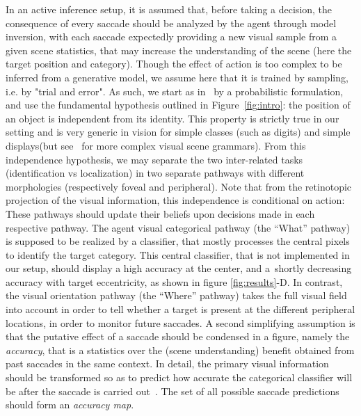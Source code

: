 \CNS
In an active inference setup, it is assumed that, before taking a decision, the consequence of every saccade should be analyzed by the agent through model inversion,  with each saccade expectedly providing a new visual sample from a given scene statistics, that may increase the understanding of the scene (here the target position and category). Though the effect of action is too complex to be inferred from a generative model, we assume here that it is trained by sampling, i.e. by "trial and error". 
As such, we start as in~\citep{Friston12} by a probabilistic formulation, and use the fundamental hypothesis outlined in Figure~\ref{fig:intro}: the position of an object is independent from its identity. This property is strictly true in our setting and is very generic in vision for simple classes (such as digits) and simple displays\CNS (but see~\citep{Vo12} for more complex visual scene grammars)\fi . From this independence hypothesis, we may separate the two inter-related tasks (identification vs localization) in two separate pathways with different morphologies (respectively foveal and peripheral). Note that from the retinotopic projection of the visual information, this independence is conditional on action: These pathways should update their beliefs upon decisions made in each respective pathway.
The agent visual categorical pathway (the ``What'' pathway) is supposed to be realized by a classifier, that mostly processes the central pixels to identify the target category. This central classifier, that is not implemented in our setup, should display a high accuracy at the center, and a shortly decreasing accuracy with target eccentricity, as shown in figure \ref{fig:results}-D.
In contrast, the visual orientation pathway (the ``Where'' pathway) takes the full visual field into account in order to tell whether a target is present at the different peripheral locations, in order to monitor future saccades. 
A second simplifying assumption is that the putative effect of a saccade should be condensed in a figure, namely the \emph{accuracy}, that is a statistics over the (scene understanding) benefit obtained from past saccades in the same context. In detail, the primary visual information should be transformed so as to predict how accurate the categorical classifier will be after the saccade is carried out~\citep{Dauce18}. The set of all possible saccade predictions should form an \emph{accuracy map}.
